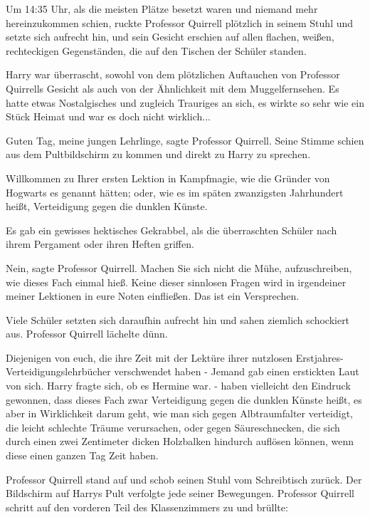 Um 14:35 Uhr, als die meisten Plätze besetzt waren und niemand mehr
hereinzukommen schien, ruckte Professor Quirrell plötzlich in seinem Stuhl und
setzte sich aufrecht hin, und sein Gesicht erschien auf allen flachen, weißen,
rechteckigen Gegenständen, die auf den Tischen der Schüler standen.

Harry war überrascht, sowohl von dem plötzlichen Auftauchen von Professor
Quirrells Gesicht als auch von der Ähnlichkeit mit dem Muggelfernsehen. Es hatte
etwas Nostalgisches und zugleich Trauriges an sich, es wirkte so sehr wie ein
Stück Heimat und war es doch nicht wirklich...

\glqq{}Guten Tag, meine jungen Lehrlinge\grqq{}, sagte Professor Quirrell. Seine
Stimme schien aus dem Pultbildschirm zu kommen und direkt zu Harry zu sprechen.

\glqq{}Willkommen zu Ihrer ersten Lektion in Kampfmagie, wie die Gründer von
Hogwarts es genannt hätten; oder, wie es im späten zwanzigsten Jahrhundert
heißt, Verteidigung gegen die dunklen Künste.\grqq{}

Es gab ein gewisses hektisches Gekrabbel, als die überraschten Schüler nach
ihrem Pergament oder ihren Heften griffen.

\glqq{}Nein\grqq{}, sagte Professor Quirrell. \glqq{}Machen Sie sich nicht die
Mühe, aufzuschreiben, wie dieses Fach einmal hieß. Keine dieser sinnlosen Fragen
wird in irgendeiner meiner Lektionen in eure Noten einfließen. Das ist ein
Versprechen.\grqq{}

Viele Schüler setzten sich daraufhin aufrecht hin und sahen ziemlich schockiert
aus. Professor Quirrell lächelte dünn.

\glqq{}Diejenigen von euch, die ihre Zeit mit der Lektüre ihrer nutzlosen
Erstjahres-Verteidigungslehrbücher verschwendet haben -\grqq{} Jemand gab einen
erstickten Laut von sich. Harry fragte sich, ob es Hermine war. \glqq{}- haben
vielleicht den Eindruck gewonnen, dass dieses Fach zwar Verteidigung gegen die
dunklen Künste heißt, es aber in Wirklichkeit darum geht, wie man sich gegen
Albtraumfalter verteidigt, die leicht schlechte Träume verursachen, oder gegen
Säureschnecken, die sich durch einen zwei Zentimeter dicken Holzbalken hindurch
auflösen können, wenn diese einen ganzen Tag Zeit haben.\grqq{}

Professor Quirrell stand auf und schob seinen Stuhl vom Schreibtisch zurück. Der
Bildschirm auf Harrys Pult verfolgte jede seiner Bewegungen. Professor Quirrell
schritt auf den vorderen Teil des Klassenzimmers zu und brüllte:

